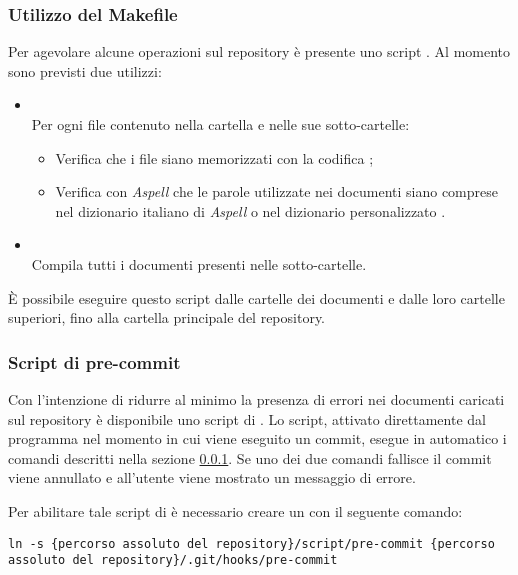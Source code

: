 \subsubsection{Utilizzo del Makefile}
\label{makefile}

Per agevolare alcune operazioni sul repository è presente uno script . Al momento sono previsti due utilizzi:
\begin{itemize}
 \item \textbf{} \\
	Per ogni file  contenuto nella cartella e nelle sue sotto-cartelle:
	\begin{itemize}
		\item Verifica che i file siano memorizzati con la codifica ;
		\item Verifica con \emph{Aspell} che le parole utilizzate nei documenti siano comprese nel dizionario italiano di \emph{Aspell} o nel dizionario personalizzato .
	\end{itemize}
 \item \textbf{} \\
	Compila tutti i documenti presenti nelle sotto-cartelle.

\end{itemize}

È possibile eseguire questo script dalle cartelle dei documenti e dalle loro cartelle superiori, fino alla cartella principale del repository.

\subsubsection{Script di pre-commit}

Con l'intenzione di ridurre al minimo la presenza di errori nei documenti caricati sul repository è disponibile uno script di . Lo script, attivato direttamente dal programma  nel momento in cui viene eseguito un commit, esegue in automatico i comandi descritti nella sezione \ref{makefile}. Se uno dei due comandi fallisce il commit viene annullato e all'utente viene mostrato un messaggio di errore.

Per abilitare tale script di  è necessario creare un  con il seguente comando:
\begin{lstlisting}
ln -s {percorso assoluto del repository}/script/pre-commit {percorso assoluto del repository}/.git/hooks/pre-commit
\end{lstlisting}

